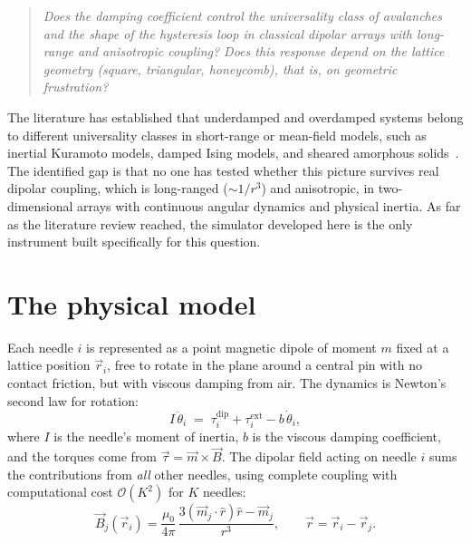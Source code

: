 \documentclass[11pt,a4paper]{article}
\begin{document}
\begin{quote}\itshape
Does the damping coefficient control the universality class of avalanches and the shape of the hysteresis loop in classical dipolar arrays with long-range and anisotropic coupling? Does this response depend on the lattice geometry (square, triangular, honeycomb), that is, on geometric frustration?
\end{quote}

The literature has established that underdamped and overdamped systems belong to different universality classes in short-range or mean-field models, such as inertial Kuramoto models, damped Ising models, and sheared amorphous solids~\cite{dahmen2011}. The identified gap is that no one has tested whether this picture survives real dipolar coupling, which is long-ranged ($\sim 1/r^3$) and anisotropic, in two-dimensional arrays with continuous angular dynamics and physical inertia. As far as the literature review reached, the simulator developed here is the only instrument built specifically for this question.

\section{The physical model}

Each needle $i$ is represented as a point magnetic dipole of moment $m$ fixed at a lattice position $\vec r_i$, free to rotate in the plane around a central pin with no contact friction, but with viscous damping from air. The dynamics is Newton's second law for rotation:
\begin{equation}
I\,\ddot\theta_i \;=\; \tau_i^{\mathrm{dip}} + \tau_i^{\mathrm{ext}}
- b\,\dot\theta_i,
\label{eq:eom}
\end{equation}
where $I$ is the needle's moment of inertia, $b$ is the viscous damping coefficient, and the torques come from $\vec\tau = \vec m \times \vec B$. The dipolar field acting on needle $i$ sums the contributions from \emph{all} other needles, using complete coupling with computational cost $\mathcal{O}(K^2)$ for $K$ needles:
\begin{equation}
\vec B_j(\vec r_i) = \frac{\mu_0}{4\pi}\,
\frac{3(\vec m_j \cdot \hat r)\hat r - \vec m_j}{r^3},
\qquad \vec r = \vec r_i - \vec r_j .
\end{equation}
\end{document}
